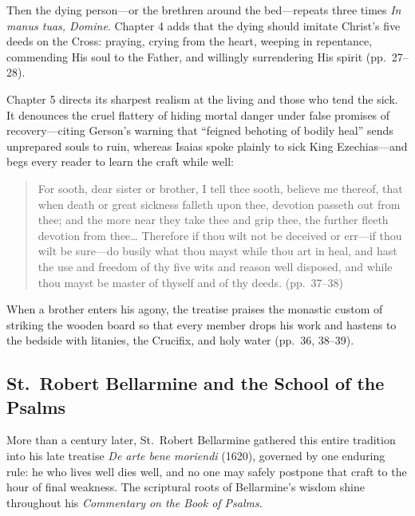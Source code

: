 Then the dying person---or the brethren around the bed---repeats three times \emph{In manus tuas, Domine}. Chapter 4 adds that the dying should imitate Christ's five deeds on the Cross: praying, crying from the heart, weeping in repentance, commending His soul to the Father, and willingly surrendering His spirit (pp.\ 27--28).

Chapter 5 directs its sharpest realism at the living and those who tend the sick. It denounces the cruel flattery of hiding mortal danger under false promises of recovery---citing Gerson's warning that ``feigned behoting of bodily heal'' sends unprepared souls to ruin, whereas Isaias spoke plainly to sick King Ezechias---and begs every reader to learn the craft while well:

\begin{quote}
For sooth, dear sister or brother, I tell thee sooth, believe me thereof, that when death or great sickness falleth upon thee, devotion passeth out from thee; and the more near they take thee and grip thee, the further fleeth devotion from thee\ldots{} Therefore if thou wilt not be deceived or err---if thou wilt be sure---do busily what thou mayst while thou art in heal, and hast the use and freedom of thy five wits and reason well disposed, and while thou mayst be master of thyself and of thy deeds. (pp.\ 37--38)
\end{quote}

When a brother enters his agony, the treatise praises the monastic custom of striking the wooden board so that every member drops his work and hastens to the bedside with litanies, the Crucifix, and holy water (pp.\ 36, 38--39).

\subsection{St.\ Robert Bellarmine and the School of the Psalms}

More than a century later, St.\ Robert Bellarmine gathered this entire tradition into his late treatise \emph{De arte bene moriendi} (1620), governed by one enduring rule: he who lives well dies well, and no one may safely postpone that craft to the hour of final weakness. The scriptural roots of Bellarmine's wisdom shine throughout his \emph{Commentary on the Book of Psalms}.

